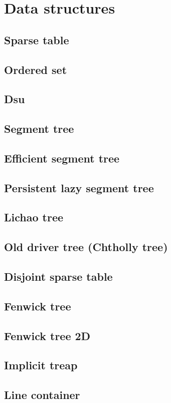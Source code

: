 \section{Data structures}

\subsection{Sparse table}

\subsection{Ordered set}

\subsection{Dsu}

\subsection{Segment tree}

\subsection{Efficient segment tree}

\subsection{Persistent lazy segment tree}

\subsection{Lichao tree}

\subsection{Old driver tree (Chtholly tree)}

\subsection{Disjoint sparse table}

\subsection{Fenwick tree}

\subsection{Fenwick tree 2D}

\subsection{Implicit treap}

\subsection{Line container}
